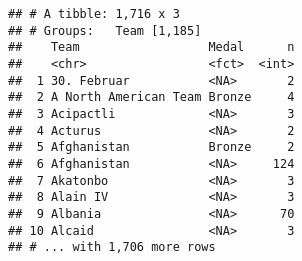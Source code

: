 \documentclass[
]{article}
\begin{document}
\begin{verbatim}
## # A tibble: 1,716 x 3
## # Groups:   Team [1,185]
##    Team                  Medal      n
##    <chr>                 <fct>  <int>
##  1 30. Februar           <NA>       2
##  2 A North American Team Bronze     4
##  3 Acipactli             <NA>       3
##  4 Acturus               <NA>       2
##  5 Afghanistan           Bronze     2
##  6 Afghanistan           <NA>     124
##  7 Akatonbo              <NA>       3
##  8 Alain IV              <NA>       3
##  9 Albania               <NA>      70
## 10 Alcaid                <NA>       3
## # ... with 1,706 more rows
\end{verbatim}
\end{document}
